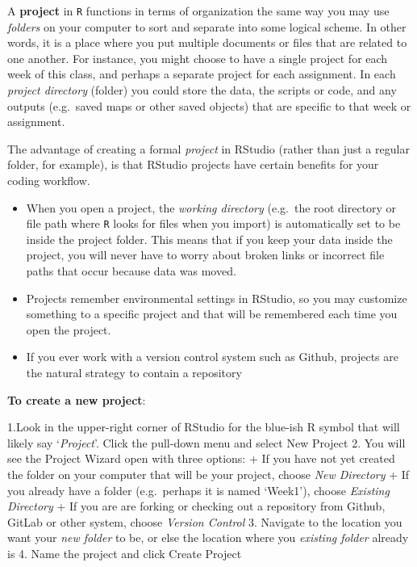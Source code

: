 \documentclass[
]{book}
\newcommand{\passthrough}[1]{#1}
\providecommand{\tightlist}{%
  \setlength{\itemsep}{0pt}\setlength{\parskip}{0pt}}
\begin{document}
A \textbf{project} in \passthrough{\lstinline!R!} functions in terms of organization the same way you may use \emph{folders} on your computer to sort and separate into some logical scheme. In other words, it is a place where you put multiple documents or files that are related to one another. For instance, you might choose to have a single project for each week of this class, and perhaps a separate project for each assignment. In each \emph{project directory} (folder) you could store the data, the scripts or code, and any outputs (e.g.~saved maps or other saved objects) that are specific to that week or assignment.

The advantage of creating a formal \emph{project} in RStudio (rather than just a regular folder, for example), is that RStudio projects have certain benefits for your coding workflow.

\begin{itemize}
\tightlist
\item
  When you open a project, the \emph{working directory} (e.g.~the root directory or file path where \passthrough{\lstinline!R!} looks for files when you import) is automatically set to be inside the project folder. This means that if you keep your data inside the project, you will never have to worry about broken links or incorrect file paths that occur because data was moved.
\item
  Projects remember environmental settings in RStudio, so you may customize something to a specific project and that will be remembered each time you open the project.
\item
  If you ever work with a version control system such as Github, projects are the natural strategy to contain a repository
\end{itemize}

\textbf{To create a new project}:

1.Look in the upper-right corner of RStudio for the blue-ish R symbol that will likely say `\emph{Project}'. Click the pull-down menu and select New Project
2. You will see the Project Wizard open with three options:
+ If you have not yet created the folder on your computer that will be your project, choose \emph{New Directory}
+ If you already have a folder (e.g.~perhaps it is named `Week1'), choose \emph{Existing Directory}
+ If you are are forking or checking out a repository from Github, GitLab or other system, choose \emph{Version Control}
3. Navigate to the location you want your \emph{new folder} to be, or else the location where you \emph{existing folder} already is
4. Name the project and click Create Project
\end{document}
